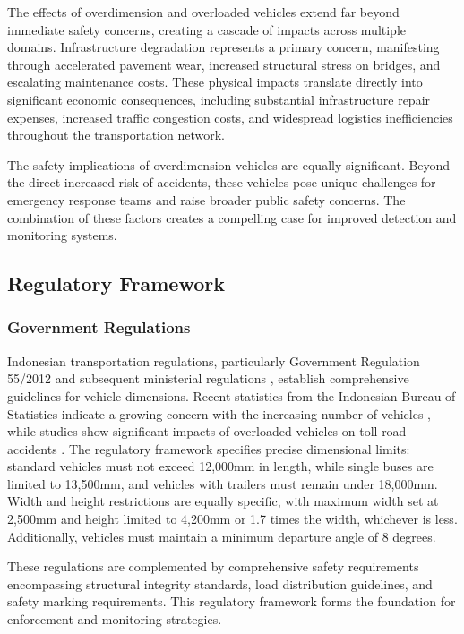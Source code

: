 The effects of overdimension and overloaded vehicles extend far beyond immediate safety concerns, creating a cascade of impacts across multiple domains. Infrastructure degradation represents a primary concern, manifesting through accelerated pavement wear, increased structural stress on bridges, and escalating maintenance costs. These physical impacts translate directly into significant economic consequences, including substantial infrastructure repair expenses, increased traffic congestion costs, and widespread logistics inefficiencies throughout the transportation network.

The safety implications of overdimension vehicles are equally significant. Beyond the direct increased risk of accidents, these vehicles pose unique challenges for emergency response teams and raise broader public safety concerns. The combination of these factors creates a compelling case for improved detection and monitoring systems.

\subsection{Regulatory Framework}

\subsubsection{Government Regulations}
Indonesian transportation regulations, particularly Government Regulation 55/2012 and subsequent ministerial regulations \cite{kemenhub2015, kemenhub2016}, establish comprehensive guidelines for vehicle dimensions. Recent statistics from the Indonesian Bureau of Statistics indicate a growing concern with the increasing number of vehicles \cite{bps2023}, while studies show significant impacts of overloaded vehicles on toll road accidents \cite{odol2020}. The regulatory framework specifies precise dimensional limits: standard vehicles must not exceed 12,000mm in length, while single buses are limited to 13,500mm, and vehicles with trailers must remain under 18,000mm. Width and height restrictions are equally specific, with maximum width set at 2,500mm and height limited to 4,200mm or 1.7 times the width, whichever is less. Additionally, vehicles must maintain a minimum departure angle of 8 degrees.

These regulations are complemented by comprehensive safety requirements encompassing structural integrity standards, load distribution guidelines, and safety marking requirements. This regulatory framework forms the foundation for enforcement and monitoring strategies.

